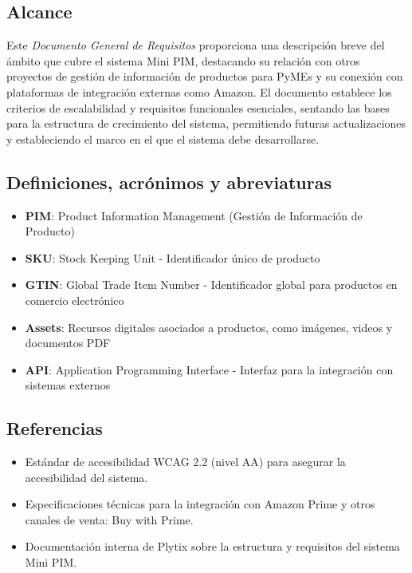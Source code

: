 \documentclass[12pt.a4paper]{article}
\begin{document}
\subsection{Alcance}

Este \textit{Documento General de Requisitos} proporciona una descripción breve del ámbito que cubre el sistema Mini PIM, destacando su relación con otros proyectos de gestión de información de productos para PyMEs y su conexión con plataformas de integración externas como Amazon. El documento establece los criterios de escalabilidad y requisitos funcionales esenciales, sentando las bases para la estructura de crecimiento del sistema, permitiendo futuras actualizaciones y estableciendo el marco en el que el sistema debe desarrollarse.


\subsection{Definiciones, acrónimos y abreviaturas}

\begin{itemize}
    \item \textbf{PIM}: Product Information Management (Gestión de Información de Producto)
    \item \textbf{SKU}: Stock Keeping Unit - Identificador único de producto
    \item \textbf{GTIN}: Global Trade Item Number - Identificador global para productos en comercio electrónico
    \item \textbf{Assets}: Recursos digitales asociados a productos, como imágenes, videos y documentos PDF
    \item \textbf{API}: Application Programming Interface - Interfaz para la integración con sistemas externos
\end{itemize}

\subsection{Referencias}

\begin{itemize}
    \item Estándar de accesibilidad WCAG 2.2 (nivel AA) para asegurar la accesibilidad del sistema.
    \item Especificaciones técnicas para la integración con Amazon Prime y otros canales de venta: Buy with Prime.
    \item Documentación interna de Plytix sobre la estructura y requisitos del sistema Mini PIM.
\end{itemize}
\end{document}
